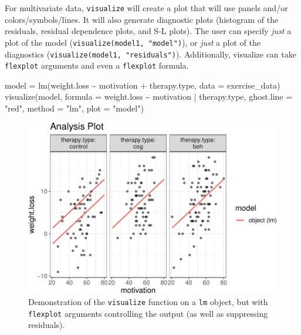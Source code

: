 \documentclass[
  english,
  man]{apa6}
\newenvironment{Shaded}{\begin{snugshade}}{\end{snugshade}}
\newcommand{\AttributeTok}[1]{\textcolor[rgb]{0.77,0.63,0.00}{#1}}
\newcommand{\FunctionTok}[1]{\textcolor[rgb]{0.00,0.00,0.00}{#1}}
\newcommand{\NormalTok}[1]{#1}
\newcommand{\OtherTok}[1]{\textcolor[rgb]{0.56,0.35,0.01}{#1}}
\newcommand{\SpecialCharTok}[1]{\textcolor[rgb]{0.00,0.00,0.00}{#1}}
\newcommand{\StringTok}[1]{\textcolor[rgb]{0.31,0.60,0.02}{#1}}
\begin{document}
\normalsize

For multivariate data, \texttt{visualize} will create a plot that will use panels and/or colors/symbols/lines. It will also generate diagnostic plots (histogram of the residuals, residual dependence plots, and S-L plots). The user can specify \emph{just} a plot of the model (\texttt{visualize(model1,\ "model")}), or \emph{just} a plot of the diagnostics (\texttt{visualize(model1,\ "residuals")}). Additionally, visualize can take \texttt{flexplot} arguments and even a \texttt{flexplot} formula.

\small

\begin{Shaded}
\begin{Highlighting}[]
\NormalTok{model }\OtherTok{=} \FunctionTok{lm}\NormalTok{(weight.loss }\SpecialCharTok{\textasciitilde{}}\NormalTok{ motivation }\SpecialCharTok{+}\NormalTok{ therapy.type, }\AttributeTok{data =}\NormalTok{ exercise\_data)}
\FunctionTok{visualize}\NormalTok{(model, }\AttributeTok{formula =}\NormalTok{ weight.loss }\SpecialCharTok{\textasciitilde{}}\NormalTok{ motivation }\SpecialCharTok{|}\NormalTok{ therapy.type, }
          \AttributeTok{ghost.line =} \StringTok{"red"}\NormalTok{, }\AttributeTok{method =} \StringTok{"lm"}\NormalTok{, }\AttributeTok{plot =} \StringTok{"model"}\NormalTok{)}
\end{Highlighting}
\end{Shaded}

\begin{figure}
\centering
\includegraphics{flexplot_psychmeth_files/figure-latex/ancova2-1.pdf}
\caption{\label{fig:ancova2}Demonstration of the \texttt{visualize} function on a \texttt{lm} object, but with \texttt{flexplot} arguments controlling the output (as well as suppressing residuals). \label{fig:ancova2}}
\end{figure}
\end{document}
